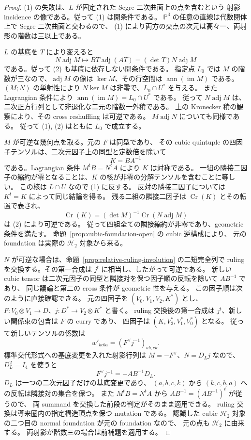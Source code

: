 \begin{proof}
(1) の失敗は、$L$ が固定された Segre 二次曲面上の点を含むという
射影 incidence の像である。従って (1) は開条件である。
$\mathbb P^3$ の任意の直線は代数閉体上で Segre 二次曲面と交わるので、
(1) により両方の交点の次元は高々一、両射影の階数は三以上である。

$L$ の基底を $T$ により変えると
\[
 N\operatorname{adj}M\longmapsto
 BT\operatorname{adj}(AT)=(\det T)N\operatorname{adj}M
\]
である。従って (2) も基底に依存しない開条件である。
指定点 $L_0$ では $M$ の階数が三なので、$\operatorname{adj}M$ の像は
$\ker M$、その行空間は $\operatorname{ann}(\operatorname{im}M)$ である。
$(M;N)$ の単射性により $N\ker M$ は非零で、$L_0\cap U^*$ を与える。
また Lagrangian 条件により
$\operatorname{ann}(\operatorname{im}M)=L_0\cap U^*$ である。
従って $N\operatorname{adj}M$ は、二次正方行列として非退化な二元の階数一外積である。
上の Kronecker 積の観察により、その cross reshuffling は可逆である。
$M\operatorname{adj}N$ についても同様である。
従って (1), (2) はともに $L_0$ で成立する。

$M$ が可逆な幾何点を取る。元の $F$ は同型であり、
その cubic quintuple の四因子テンソルは、二次元因子上の同型と定数倍を除いて
\[
 K=BA^{-1}
\]
である。Lagrangian 条件 $M^tB=N^tA$ により $K$ は対称である。
一組の隣接二因子の縮約が零となることは、$K$ の核が非零の分解テンソルを含むことに等しい。
この核は $L\cap U$ なので (1) に反する。
反対の隣接二因子については $K^t=K$ によって同じ結論を得る。
残る二組の隣接二因子は $\operatorname{Cr}(K)$ とその転置で表され、
\[
 \operatorname{Cr}(K)
 = (\det M)^{-1}\operatorname{Cr}(N\operatorname{adj}M)
\]
は (2) により可逆である。
従って四組全ての隣接縮約が非零であり、geometric 条件を満たす。
命題~\ref{prop:cubic-foundation-open} の cubic 逆構成により、
元の foundation は実際の $\mathcal H_2$ 対象から来る。

$N$ が可逆な場合は、命題~\ref{prop:relative-ruling-involution} の二短完全列で
ruling を交換する。その第一合成は $j^t$ に相当し、したがって可逆である。
新しい cubic tensor は二次元因子の同型と隣接対を保つ因子順の反転を除いて $AB^{-1}$ であり、
同じ議論と第二の cross 条件が geometric 性を与える。
この因子順は次のように直接確認できる。
元の四因子を $(V_0,V_1,V_2,K^*)$ とし、
$F:V_0\otimes V_1\to D$、$j:D^*\to V_2\otimes K^*$ と書く。
ruling 交換後の第一合成は $j^t$、新しい関係束の包含は $F$ の curry であり、
四因子は $(K,V_2^*,V_1^*,V_0^*)$ となる。
従って新しいテンソルの係数は
\[
 w'_{kcba}=(F^\vee j^{-1})_{ab,ck}.
\]
標準交代形式への基底変更を入れた射影行列は
$M=-F^\vee$、$N=D_Lj$ なので、$D_L^2=I_4$ を使うと
\[
 F^\vee j^{-1}=-AB^{-1}D_L.
\]
$D_L$ は一つの二次元因子だけの基底変更であり、
$(a,b,c,k)$ から $(k,c,b,a)$ への反転は隣接対の集合を保つ。
また $M^tB=N^tA$ から $AB^{-1}=(AB^{-1})^t$ が従うので、
両 summand を交換した前段の判定がそのまま適用できる。
ruling 交換は導来圏内の指定構造頂点を保つ mutation である。
認識した cubic $\mathcal H_2$ 対象の二つ目の normal foundation が元の foundation なので、
元の点も $\mathcal H_2$ に由来する。
両射影が階数三の場合は前補題を適用する。
\end{proof}


